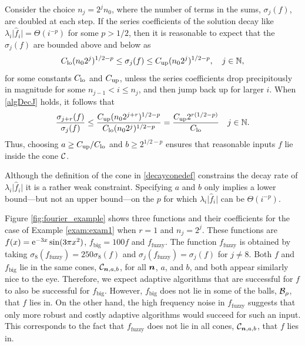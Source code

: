 \documentclass[graybox,footinfo]{svmult}
\newcommand{\DHJRbigabs}[1]{\ensuremath{{\bigl \lvert #1 \bigr \rvert}}}
\begin{document}
Consider the choice 
$n_j = 2^{j}n_0$,
where the number of terms in the sums, $\sigma_j(f)$, are doubled at each step.  If the series coefficients of the solution decay like $\lambda_{i} \DHJRbigabs{\widehat{f}_{i}} = \Theta(i^{-p})$ for some $p>1/2$, then it is reasonable to expect that the $\sigma_j(f)$ are bounded above and below as
\begin{equation} \label{algDecJ}
C_{\textup{lo}} (n_02^j)^{1/2-p} \le \sigma_j(f) \le C_{\textup{up}} (n_02^j)^{1/2-p}, \quad   j \in \bbN,
\end{equation}
for some constants $C_{\textup{lo}}$ and $C_{\textup{up}}$, unless the series coefficients drop precipitously in magnitude for some $n_{j-1} < i \le n_j$, and then jump back up for larger $i$.  When \eqref{algDecJ} holds, it follows that
\begin{equation*} 
\frac{\sigma_{j+r}(f)}{\sigma_j(f)} \le \frac{C_{\textup{up}} (n_02^{j+r})^{1/2-p}}{C_{\textup{lo}} (n_02^j)^{1/2-p}} = \frac{C_{\textup{up}} 2^{r(1/2-p)}}{C_{\textup{lo}}}\quad   j \in {\mathbb{N}}.
\end{equation*}
Thus, choosing $a \ge C_{\textup{up}}/C_{\textup{lo}}$ and $b \ge 2^{1/2-p}$ ensures that reasonable inputs $f$ lie inside the cone ${\mathcal{C}}$.

Although the definition of the cone in \eqref{decayconedef} constrains the decay rate of $\lambda_{i} \DHJRbigabs{\widehat{f}_{i}}$ it is a rather weak constraint.  Specifying $a$ and $b$ only implies a lower bound---but not an upper bound---on the $p$ for which $\lambda_{i} \DHJRbigabs{\widehat{f}_{i}}$ can be $\Theta(i^{-p})$.

Figure \ref{fig:fourier_example} shows three functions and their coefficients for the case of Example \ref{exam:exam1} when $r=1$ and $n_j=2^j$. These  functions are $f(x)={\rm e}^{-3x}\sin(3\pi x^2)$, $f_{\text{big}}=100f$ and $f_{\text{fuzzy}}$. The function $f_{\text{fuzzy}}$ is obtained by taking $\sigma_8(f_{\text{fuzzy}})=250\sigma_8(f)$ and $\sigma_j(f_{\text{fuzzy}})=\sigma_j(f)$ for $j \ne 8$.  Both $f$ and $f_{\text{big}}$ lie in the same cones, ${\mathcal{C}}_{{\boldsymbol{n}},a,b}$, for all ${\boldsymbol{n}}$, $a$, and $b$, and both appear similarly nice to the eye.  Therefore, we expect adaptive algorithms that are successful for $f$ to also be successful for $f_{\text{big}}$. However, $f_{\text{big}}$ does not lie in some of the balls,  ${\mathcal{B}}_{\rho}$, that $f$ lies in.  On the other hand, the high frequency noise in $f_{\text{fuzzy}}$ suggests that only more robust and costly adaptive algorithms would succeed for such an input.  This corresponds to the fact that $f_{\text{fuzzy}}$ does not lie in all cones, ${\mathcal{C}}_{{\boldsymbol{n}},a,b}$, that $f$ lies in.
\end{document}
